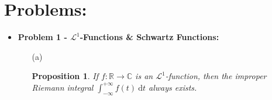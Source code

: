 \documentclass[12pt, reqno]{amsart}
\newtheorem{prop}{Proposition}[section]
\theoremstyle{definition}
\theoremstyle{remark}
\newcommand{\ud}{\mathrm{d}}
\begin{document}

\section{Problems:} 

\begin{itemize}

\item {\bf{Problem 1 - $\mathcal{L}^1$-Functions \& Schwartz Functions:}} 

\vspace{0.1 cm}
\begin{itemize}
\item[(a)] 

\begin{prop}
If $f: \mathbb{R} \to \mathbb{C}$ is an $\mathcal{L}^1$-function, then the improper Riemann integral $\int_{-\infty}^{+\infty} f(t) ~\ud t$ always exists. 
\end{prop}


\end{itemize}
\end{itemize}
\end{document}
